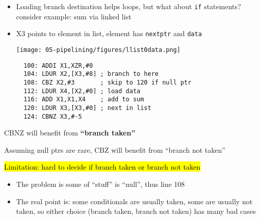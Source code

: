 \begin{frame}[fragile]
  \begin{itemize}
  \item Loading branch destination helps loops, but what about \texttt{if} statements? consider example: sum via linked list
\item X3 points to element in list, element has \texttt{nextptr} and {\tt data}
    \begin{center}
      \texttt{[image: 05-pipelining/figures/llist0data.png]}
      \end{center}
      {\footnotesize
\begin{verbatim}
  100: ADDI X1,XZR,#0
  104: LDUR X2,[X3,#8] ; branch to here
  108: CBZ X2,#3       ; skip to 120 if null ptr
  112: LDUR X4,[X2,#0] ; load data
  116: ADD X1,X1,X4    ; add to sum
  120: LDUR X3,[X3,#0] ; next in list
  124: CBNZ X3,#-5
\end{verbatim}
}
  \end{itemize}
 \begin{tcolorbox}[enhanced,attach boxed title to top center={yshift=-3mm,yshifttext=-1mm},
  colback=blue!5!white,colframe=blue!75!black,colbacktitle=blue!80!black,
  title=Think About It,fonttitle=\bfseries,
  boxed title style={size=small,colframe=red!50!black} ]
  CBNZ will benefit from \textbf{``branch taken''}

  Assuming null ptrs are rare, CBZ will benefit from ``branch not taken''

  \hl{Limitation: hard to decide if branch taken or branch not taken}
\end{tcolorbox}

  
\BNotes\ifnum{}
\begin{itemize}
\item The problem is some of ``stuff'' is ``null'',  thus line 108
  \item The real point is: some conditionals are usually taken, some are usually not taken, so either choice (branch taken, branch not taken) has many bad cases
\end{itemize}
\fi\ENotes
\end{frame}

